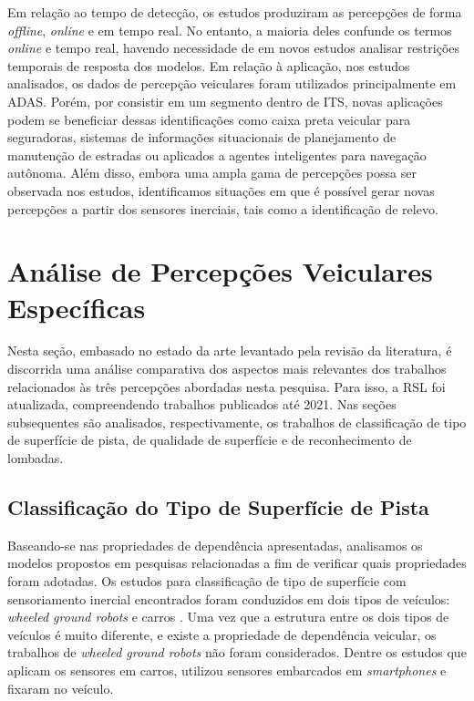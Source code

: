 Em relação ao tempo de detecção, os estudos produziram as percepções de forma \textit{offline}, \textit{online} e em tempo real. No entanto, a maioria deles confunde os termos \textit{online} e tempo real, havendo necessidade de em novos estudos analisar restrições temporais de resposta dos modelos. Em relação à aplicação, nos estudos analisados, os dados de percepção veiculares foram utilizados principalmente em ADAS. Porém, por consistir em um segmento dentro de ITS, novas aplicações podem se beneficiar dessas identificações como caixa preta veicular para seguradoras, sistemas de informações situacionais de planejamento de manutenção de estradas ou aplicados a agentes inteligentes para navegação autônoma. Além disso, embora uma ampla gama de percepções possa ser observada nos estudos, identificamos situações em que é possível gerar novas percepções a partir dos sensores inerciais, tais como a identificação de relevo.

\section{Análise de Percepções Veiculares Específicas}

Nesta seção, embasado no estado da arte levantado pela revisão da literatura, é discorrida uma análise comparativa dos aspectos mais relevantes dos trabalhos relacionados às três percepções abordadas nesta pesquisa. Para isso, a RSL foi atualizada, compreendendo trabalhos publicados até 2021. Nas seções subsequentes são analisados, respectivamente, os trabalhos de classificação de tipo de superfície de pista, de qualidade de superfície e de reconhecimento de lombadas.

\subsection{Classificação do Tipo de Superfície de Pista}

Baseando-se nas propriedades de dependência apresentadas, analisamos os modelos propostos em pesquisas relacionadas a fim de verificar quais propriedades foram adotadas. Os estudos para classificação de tipo de superfície com sensoriamento inercial encontrados foram conduzidos em dois tipos de veículos: \textit{wheeled ground robots} \cite{Khaleghian2017, Sebastian2019, Tolentino-Rabelo2016} e carros \cite{Souza2018, Wang2018_1, Wang2017}. Uma vez que a estrutura entre os dois tipos de veículos é muito diferente, e existe a propriedade de dependência veicular, os trabalhos de \textit{wheeled ground robots} não foram considerados. Dentre os estudos que aplicam os sensores em carros,  utilizou sensores embarcados em \textit{smartphones} e  fixaram no veículo. 

